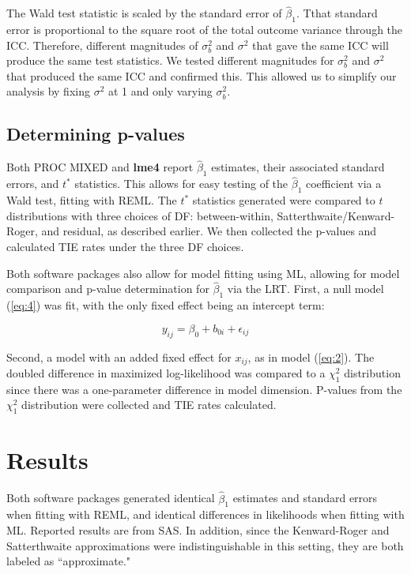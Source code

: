 \documentclass[twocolumn]{bmcart}%
\begin{document}
The Wald test statistic is scaled by the standard error of $\hat{\beta}_1$. Tthat standard error is proportional to the square root of the total outcome variance through the ICC. Therefore, different magnitudes of $\sigma_b^2$ and $\sigma^2$ that gave the same ICC will produce the same test statistics. We tested different magnitudes for $\sigma_b^2$ and $\sigma^2$ that produced the same ICC and confirmed this. This allowed us to simplify our analysis by fixing $\sigma^2$ at 1 and only varying $\sigma^2_b$.


\subsection*{Determining p-values}

Both PROC MIXED and \textbf{lme4} report $\hat{\beta}_1$ estimates, their associated standard errors, and $t^*$ statistics. This allows for easy testing of the $\hat{\beta}_1$ coefficient via a Wald test, fitting with REML. The $t^*$ statistics generated were compared to $t$ distributions with three choices of DF: between-within, Satterthwaite/Kenward-Roger, and residual, as described earlier. We then collected the p-values and calculated TIE rates under the three DF choices.

Both software packages also allow for model fitting using ML, allowing for model comparison and p-value determination for $\hat{\beta}_1$ via the LRT. First, a null model (\ref{eq:4}) was fit, with the only fixed effect being an intercept term:

\begin{equation}
  \label{eq:4}
  y_{ij} = \beta_0 + b_{0i} + \epsilon_{ij}
\end{equation}

Second, a model with an added fixed effect for $x_{ij}$, as in model (\ref{eq:2}). The doubled difference in maximized log-likelihood was compared to a $\chi^2_1$ distribution since there was a one-parameter difference in model dimension. P-values from the $\chi^2_1$ distribution were collected and TIE rates calculated.


\section*{Results}

Both software packages generated identical $\hat{\beta}_1$ estimates and standard errors when fitting with REML, and identical differences in likelihoods when fitting with ML. Reported results are from SAS. In addition, since the Kenward-Roger and Satterthwaite approximations were indistinguishable in this setting, they are both labeled as ``approximate."
\end{document}
